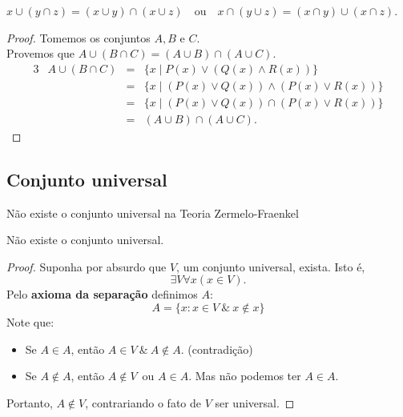       \begin{stat}
         $x \cup (y \cap z) = (x \cup y) \cap (x \cup z)$\ \ ou\ \ $x \cap (y \cup z) = (x \cap y) \cup (x \cap z)$.
         \begin{proof}
         Tomemos os conjuntos $A, B$ e $C.$\\
         Provemos que $A \cup (B \cap C) = (A \cup B) \cap (A \cup C).$
            \begin{alignat*}{3}
            & A \cup (B \cap C) &=& \{x \mid P(x) \lor (Q(x) \land R(x))\}\\
            & &=& \{x \mid (P(x) \lor Q(x)) \land (P(x) \lor R(x))\}\\
            & &=& \{x \mid (P(x) \lor Q(x)) \cap (P(x) \lor R(x))\}\\
            & &=& (A \cup B) \cap (A \cup C).
            \end{alignat*}
         \end{proof}
      \end{stat}

   \subsection{Conjunto universal}
      \begin{stat}
         Não existe o conjunto universal na Teoria Zermelo-Fraenkel
      \end{stat}
      \begin{theorem}
         Não existe o conjunto universal.
      \end{theorem}
      \begin{proof}
         Suponha por absurdo que $V$, um conjunto universal, exista. Isto é, $$\exists V \forall x (x \in V).$$
         Pelo \textbf{axioma da separação} definimos $A$: $$A = \{x:x \in V\ \&\ x \notin x\}$$
         Note que:
            \begin{itemize}
            \item  Se $A \in A$, então $A \in V\ \&\ A \notin A.$ \quad (contradição)
            \item  Se $A \notin A$, então $A \notin V$\ ou $A \in A.$ Mas não podemos ter $A \in A.$
            \end{itemize}
         Portanto, $A \notin V$, contrariando o fato de $V$ ser universal.
      \end{proof}